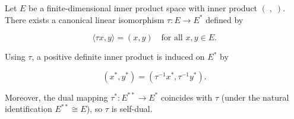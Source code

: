 Let \(E\) be a finite-dimensional inner product space with inner product \(( \; , \; )\). There exists a canonical linear isomorphism \(\tau : E \to E^*\) defined by

$$\langle \tau x, y \rangle = (x, y) \quad \text{for all } x, y \in E.$$

Using \(\tau\), a positive definite inner product is induced on \(E^*\) by

$$(x^*, y^*) = (\tau^{-1} x^*, \tau^{-1} y^*).$$

Moreover, the dual mapping \(\tau^* : E^{**} \to E^*\) coincides with \(\tau\) (under the natural identification \(E^{**} \cong E\)), so \(\tau\) is self-dual.
